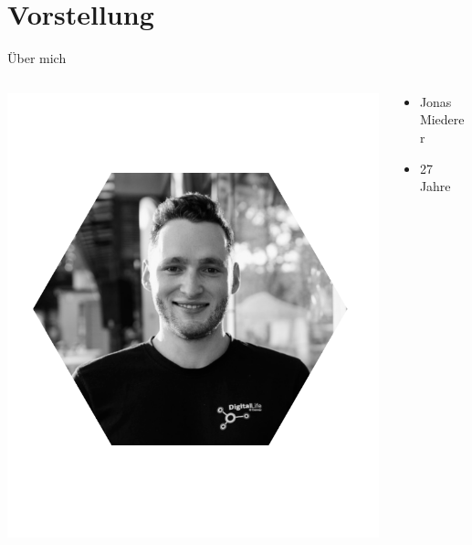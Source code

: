 \newcommand{\decktitle}{Einführung}
%
%



		
  
\section{Vorstellung}  
    \begin{frame}{Über mich}
        \begin{columns}
            \begin{column}{0.3\textwidth}
                \includegraphics[width=\textwidth]{chapters/01_introduction/figures/me.png}
            \end{column}
            \begin{column}{0.6\textwidth}
                \begin{itemize}
                    \item Jonas Miederer
                	\item 27 Jahre

\end{itemize}
\end{column}
\end{columns}
\end{frame}
